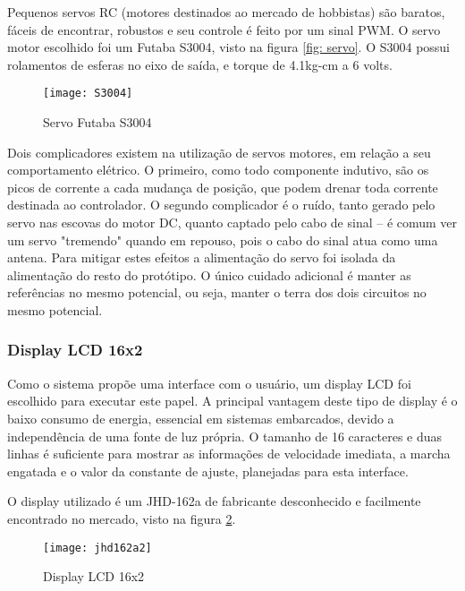 \documentclass[a4paper,11pt]{article}
\begin{document}
Pequenos servos RC (motores destinados ao mercado de hobbistas) são baratos,
fáceis de encontrar, robustos e seu controle é feito por um sinal PWM. O
servo motor escolhido foi um Futaba S3004, visto na figura \ref{fig:
servo}. O S3004 possui rolamentos de esferas no eixo de saída, e torque de
4.1kg-cm a 6 volts.

\begin{figure}[ht]
 \begin{center}
  \texttt{[image: S3004]}
 \end{center}
 \caption{Servo Futaba S3004}
 \label{fig: servo}
\end{figure}

Dois complicadores existem na utilização de servos motores\cite{servo}, em
relação a seu comportamento elétrico. O primeiro, como todo componente indutivo,
são os picos de corrente a cada mudança de posição, que podem drenar toda
corrente destinada ao controlador. O segundo complicador é o ruído, tanto gerado
pelo servo nas escovas do motor DC, quanto captado pelo cabo de sinal -- é comum
ver um servo "tremendo" quando em repouso, pois o cabo do sinal atua como uma
antena. Para mitigar estes efeitos a alimentação do servo foi isolada da
alimentação do resto do protótipo. O único cuidado adicional é manter as
referências no mesmo potencial, ou seja, manter o terra dos dois circuitos no
mesmo potencial.

\subsubsection{Display LCD 16x2}
\label{sec:lcd}

Como o sistema propõe uma interface com o usuário, um display LCD foi escolhido
para executar este papel. A principal vantagem deste tipo de display é o baixo
consumo de energia, essencial em sistemas embarcados, devido a independência de
uma fonte de luz própria. O tamanho de 16 caracteres e duas linhas é suficiente
para mostrar as informações de velocidade imediata, a marcha engatada e o valor
da constante de ajuste, planejadas para esta interface.

O display utilizado é um JHD-162a\cite{lcd} de fabricante desconhecido e
facilmente encontrado no mercado, visto na figura \ref{fig:lcd}.
\begin{figure}[ht]
\begin{center}
 \texttt{[image: jhd162a2]}
\end{center}
  \caption{Display LCD 16x2}
  \label{fig:lcd}
\end{figure}
\end{document}

